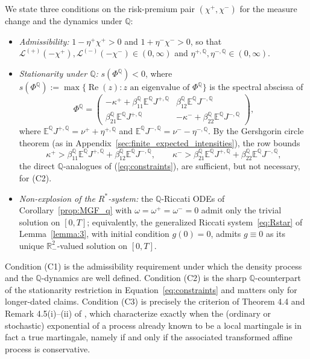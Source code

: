 \documentclass[11pt,a4paper]{article}
\numberwithin{equation}{section}
\theoremstyle{remark}
\theoremstyle{definition}
\newcommand{\E}{{\mathbb{E}}}
\providecommand{\R}{{\mathbb{R}}}
\newcommand{\q}{{\mathbb Q}}
\newcommand{\Lp}{\mathcal{L}^{(+)}}
\newcommand{\Lm}{\mathcal{L}^{(-)}}
\begin{document}
 {

We state three conditions on the risk-premium pair $(\chi^{+},\chi^{-})$ for the measure change and the dynamics under $\mathbb Q$:

\begin{itemize}[leftmargin=3em,itemsep=2pt]
\item[\textup{(C1)}] \emph{Admissibility:} $1-\eta^{+}\chi^{+}>0$ and $1+\eta^{-}\chi^{-}>0$, so that
$\Lp(-\chi^{+}),\Lm(-\chi^{-})\in(0,\infty)$ and $\eta^{+,\q},\eta^{-,\q}\in(0,\infty)$.
\item[\textup{(C2)}] \emph{Stationarity under $\q$:}
 $s(\Phi^{\q}) < 0$, where
    $s(\Phi^{\q}) := \max\{\operatorname{Re}(z) : z \text{ an eigenvalue of } \Phi^{\q}\}$
is the spectral abscissa of
\begin{equation*}
\Phi^{\q} = \begin{pmatrix} -\kappa^+ + \beta^{\q}_{11}\E^\q J^{+,\q} & \beta^{\q}_{12}\E^\q J^{-,\q} \\[2pt] \beta^{\q}_{21}\E^\q J^{+,\q} & -\kappa^- + \beta^{\q}_{22}\E^\q J^{-,\q} \end{pmatrix},
\end{equation*}
where $\E^\q J^{+,\q} = \nu^+ + \eta^{+,\q}$ and $\E^\q J^{-,\q} = \nu^- - \eta^{-,\q}$.
By the Gershgorin circle theorem (as in Appendix~\ref{sec:finite_expected_intensities}), the row bounds
\begin{equation*}
\kappa^+ > \beta^{\q}_{11}\E^\q J^{+,\q} + \beta^{\q}_{12}\E^\q J^{-,\q}, \qquad \kappa^- > \beta^{\q}_{21}\E^\q J^{+,\q} + \beta^{\q}_{22}\E^\q J^{-,\q},
\end{equation*}
the direct $\q$-analogues of (\ref{eq:constraints}), are sufficient, but not necessary, for (C2).
\item[\textup{(C3)}] \emph{Non-explosion of the $R^{*}$-system:}
the $\q$-Riccati ODEs of Corollary~\ref{prop:MGF_q} with $\omega=\omega^{+}=\omega^{-}=0$ admit only the trivial solution on $[0,T]$; equivalently, the generalized Riccati system~\eqref{eq:Rstar} of Lemma~\ref{lemma:3}, with initial condition $g(0)=0$, admits $g\equiv0$ as its unique $\R^{2}_{-}$-valued solution on $[0,T]$.\\
\end{itemize}
Condition (C1) is the admissibility requirement under which the density process and the $\q$-dynamics are well defined.
Condition (C2) is the sharp $\q$-counterpart of the stationarity restriction in Equation~\eqref{eq:constraints} and matters only for longer-dated claims.
Condition (C3) is precisely the criterion of Theorem 4.4 and Remark 4.5(i)–(ii) of \cite{Mayerhofer2011}, which characterize exactly when the (ordinary or stochastic) exponential of a process already known to be a local martingale is in fact a true martingale, namely if and only if the associated transformed affine process is conservative.

}
\end{document}
